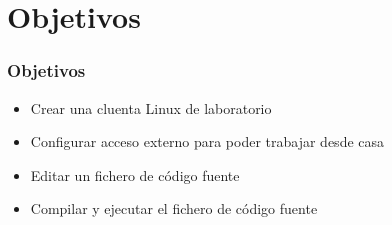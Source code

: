 \section{Objetivos}

\begin{frame}
\frametitle{Objetivos}

\begin{itemize}
	\item Crear una cluenta Linux de laboratorio
	\item Configurar acceso externo para poder trabajar desde casa
	\item Editar un fichero de código fuente
	\item Compilar y ejecutar el fichero de código fuente
\end{itemize}

\end{frame}
